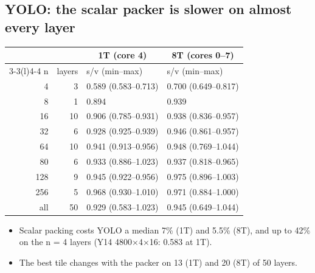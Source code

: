 \subsection{YOLO: the scalar packer is slower on almost every layer}
\begin{center}\small
\begin{tabular}{@{}rr l l@{}}
\toprule
 & & \multicolumn{1}{c}{1T (core 4)} & \multicolumn{1}{c}{8T (cores 0--7)} \\
\cmidrule(lr){3-3}\cmidrule(l){4-4}
n & layers & s/v (min--max) & s/v (min--max) \\
\midrule
4 & 3 & 0.589 (0.583--0.713) & 0.700 (0.649--0.817) \\
8 & 1 & 0.894 & 0.939 \\
16 & 10 & 0.906 (0.785--0.931) & 0.938 (0.836--0.957) \\
32 & 6 & 0.928 (0.925--0.939) & 0.946 (0.861--0.957) \\
64 & 10 & 0.941 (0.913--0.956) & 0.948 (0.769--1.044) \\
80 & 6 & 0.933 (0.886--1.023) & 0.937 (0.818--0.965) \\
128 & 9 & 0.945 (0.922--0.956) & 0.975 (0.896--1.003) \\
256 & 5 & 0.968 (0.930--1.010) & 0.971 (0.884--1.000) \\
\midrule
all & 50 & 0.929 (0.583--1.023) & 0.945 (0.649--1.044) \\
\bottomrule
\end{tabular}
\end{center}

\begin{itemize}\setlength\itemsep{1pt}
\item Scalar packing costs YOLO a median 7\% (1T) and 5.5\% (8T), and up to 42\% on the n = 4 layers (Y14 4800$\times$4$\times$16: 0.583 at 1T).
\item The best tile changes with the packer on 13 (1T) and 20 (8T) of 50 layers.
\end{itemize}

